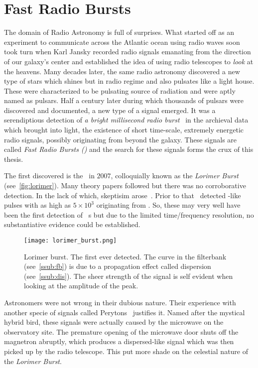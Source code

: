 \chapter{Fast Radio Bursts}\label{ch:frb}

\par The domain of Radio Astronomy is full of surprises. 
What started off as an experiment to communicate across the Atlantic ocean using radio waves soon took turn when Karl Jansky recorded radio signals emanating from the direction of our galaxy's center and established the idea of using radio telescopes to \emph{look} at the heavens.
Many decades later, the same radio astronomy discovered a new type of stars which shines but in radio regime and also pulsates like a light house. These were characterized to be pulsating source of radiation and were aptly named as pulsars.
Half a century later during which thousands of pulsars were discovered and documented, a new type of a signal emerged.
It was a serendiptious detection of \emph{a bright millisecond radio burst}~\cite{lorimerburst} in the archieval data which brought into light, the existence of short time-scale, extremely energetic radio signals, possibly originating from beyond the galaxy. 
These signals are called \emph{Fast Radio Bursts (\frb{})} and the search for these signals forms the crux of this thesis.

\par The first discovered \frb is the~\cite{lorimerburst} in $2007$, colloquially known as the \emph{Lorimer Burst} (see~\autoref{fig:lorimer}). 
Many theory papers followed but there was no corroborative detection. In the lack of which, skeptisim arose~\cite{burke_doubt}. 
Prior to that~\cite{old_m87_bursts} detected \frb-like pulses with \dm as high as $5\times 10^3$ \pc originating from . So, these may very well have been the first detection of \frb~s but due to the limited time/frequency resolution, no substantiative evidence could be established. 

\begin{figure}
	\centering
	\label{fig:lorimer}
	\texttt{[image: lorimer\_burst.png]}
	\caption{Lorimer burst. The first ever \frb{} detected. The curve in the filterbank (see~\autoref{ssub:fb}) is due to a propagation effect called dispersion (see~\autoref{ssub:dis}). The sheer strength of the signal is self evident when looking at the amplitude of the peak.}
\end{figure}

\par Astronomers were not wrong in their dubious nature. Their experience with another specie of signals called Perytons~\cite{perytons} justifies it. Named after the mystical hybrid bird, these signals were actually caused by the microwave on the observatory site. The premature opening of the microwave door shuts off the magnetron abruptly, which produces a dispersed-like signal which was then picked up by the radio telescope.
This put more shade on the celestial nature of the \emph{Lorimer Burst}.

